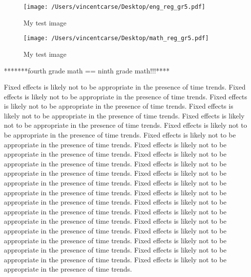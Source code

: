 \documentclass[11pt]{article}
\begin{document}
\begin{figure}
    \label{image-myimage}
    \texttt{[image: /Users/vincentcarse/Desktop/eng\_reg\_gr5.pdf]}
    \caption{My test image}
\end{figure}

\begin{figure}
    \label{image-myimage}
    \texttt{[image: /Users/vincentcarse/Desktop/math\_reg\_gr5.pdf]}
    \caption{My test image}
\end{figure}

*******fourth grade math == ninth grade math!!!****


\FloatBarrier

Fixed effects is likely not to be appropriate in the presence of time trends. 
Fixed effects is likely not to be appropriate in the presence of time trends. 
Fixed effects is likely not to be appropriate in the presence of time trends. 
Fixed effects is likely not to be appropriate in the presence of time trends. 
Fixed effects is likely not to be appropriate in the presence of time trends. 
Fixed effects is likely not to be appropriate in the presence of time trends. 
Fixed effects is likely not to be appropriate in the presence of time trends. 
Fixed effects is likely not to be appropriate in the presence of time trends. 
Fixed effects is likely not to be appropriate in the presence of time trends. 
Fixed effects is likely not to be appropriate in the presence of time trends. 
Fixed effects is likely not to be appropriate in the presence of time trends. 
Fixed effects is likely not to be appropriate in the presence of time trends. 
Fixed effects is likely not to be appropriate in the presence of time trends. 
Fixed effects is likely not to be appropriate in the presence of time trends. 
Fixed effects is likely not to be appropriate in the presence of time trends. 
Fixed effects is likely not to be appropriate in the presence of time trends. 
Fixed effects is likely not to be appropriate in the presence of time trends. 
Fixed effects is likely not to be appropriate in the presence of time trends. 
Fixed effects is likely not to be appropriate in the presence of time trends. 
Fixed effects is likely not to be appropriate in the presence of time trends. 
\end{document}
